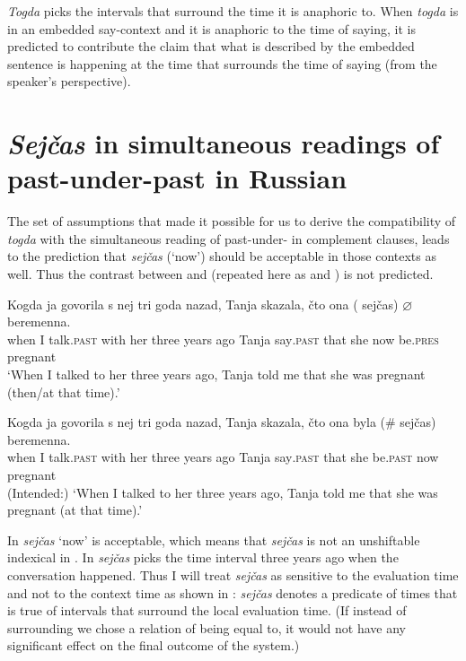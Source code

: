 \documentclass[output=paper,modfonts,newtxmath,hidelinks]{langscibook}
\begin{document}
\textit{Togda} picks the intervals that surround the time it is anaphoric to. When \textit{togda} is in an embedded say-context and it is anaphoric to the time of saying, it is predicted to contribute the claim that what is described by the embedded sentence is happening at the time that surrounds the time of saying (from the speaker’s perspective).

\section{\textit{Sejčas} in simultaneous readings of past-under-past in Russian}\label{20:s3}

The set of assumptions that made it possible for us to derive the compatibility of \textit{togda} with the simultaneous reading of past-under- in complement clauses, leads to the prediction that \textit{sejčas} (‘now’) should be acceptable in those contexts as well. Thus the contrast between  and  (repeated here as  and ) is not predicted.

\ea \label{20:ex43}
\gll Kogda ja govorila s nej tri goda nazad, Tanja skazala, čto ona\hspace{5pt} (\hspace{-2pt} sejčas) ${\varnothing}$ beremenna.\\
     when I talk\textsc{.past} with her three years ago Tanja say\textsc{.past} that she {} now be.\textsc{pres} pregnant\\
\glt `When I talked to her three years ago, Tanja told me that she was pregnant (then/at that time).'
\z

\ea \label{20:ex44}
\gll Kogda ja govorila s nej tri goda nazad, Tanja skazala, čto ona byla (\#\hspace{-2pt} sejčas) beremenna.\\
     when I talk\textsc{.past} with her three years ago Tanja say\textsc{.past} that she be.\textsc{past} {} now pregnant\\
\glt (Intended:) `When I talked to her three years ago, Tanja told me that she was pregnant (at that time).'
\z

\noindent In  \textit{sejčas} ‘now’ is acceptable, which means that \textit{sejčas} is not an unshiftable indexical in . In  \textit{sejčas} picks the time interval three years ago when the conversation happened. Thus I will treat \textit{sejčas} as sensitive to the evaluation time and not to the context time as shown in : \textit{sejčas} denotes a predicate of times that is true of intervals that surround the local evaluation time. (If instead of surrounding we chose a relation of being equal to, it would not have any significant effect on the final outcome of the system.)
\end{document}
